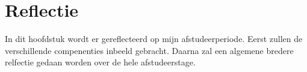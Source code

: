 \chapter{Reflectie}
In dit hoofdstuk wordt er gereflecteerd op mijn afstudeerperiode.
Eerst zullen de verschillende compenenties inbeeld gebracht.
Daarna zal een algemene bredere relfectie gedaan worden over de hele afstudeerstage.





